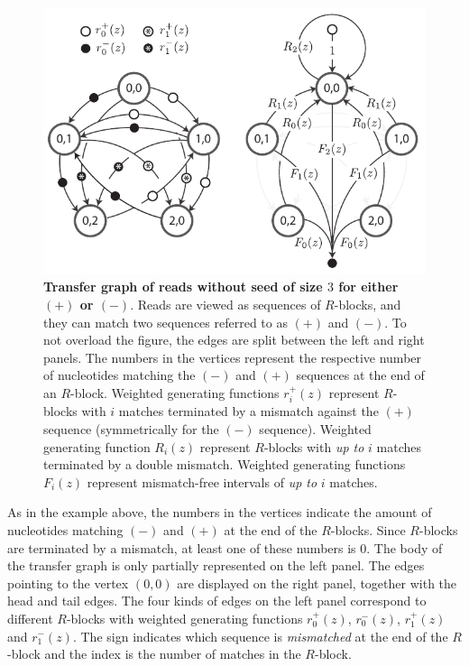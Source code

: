 \documentclass{article}
\begin{document}
\begin{figure}[h]
\centering
\includegraphics[scale=1]{false_positives_graph.pdf}
\caption{\textbf{Transfer graph of reads without seed of size $3$ for
either $(+)$ or $(-)$}. Reads are viewed as sequences of $R$-blocks, and
they can match two sequences referred to as $(+)$ and $(-)$. To not
overload the figure, the edges are split between the left and right
panels. The numbers in the vertices represent the respective number of
nucleotides matching the $(-)$ and $(+)$ sequences at the end of an
$R$-block. Weighted generating functions $r_i^+(z)$ represent $R$-blocks
with $i$ matches terminated by a mismatch against the $(+)$ sequence
(symmetrically for the $(-)$ sequence). Weighted generating function
$R_i(z)$ represent $R$-blocks with \emph{up to} $i$ matches terminated by
a double mismatch. Weighted generating functions $F_i(z)$ represent
mismatch-free intervals of \emph{up to} $i$ matches.}
\label{fig:graph_fp}
\end{figure}

As in the example above, the numbers in the vertices indicate the amount
of nucleotides matching $(-)$ and $(+)$ at the end of the $R$-blocks.
Since $R$-blocks are terminated by a mismatch, at least one of these
numbers is $0$. The body of the transfer graph is only partially
represented on the left panel. The edges pointing to the vertex $(0,0)$
are displayed on the right panel, together with the head and tail edges.
The four kinds of edges on the left panel correspond to different
$R$-blocks with weighted generating functions $r_0^+(z)$, $r_0^-(z)$,
$r_1^+(z)$ and $r_1^-(z)$. The sign indicates which sequence is
\emph{mismatched} at the end of the $R$-block and the index is the number
of matches in the $R$-block.
\end{document}
